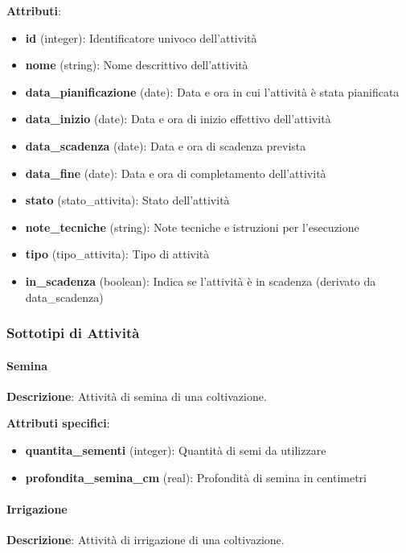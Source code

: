\documentclass[12pt,a4paper]{article}
\begin{document}
\textbf{Attributi}:
\begin{itemize}[leftmargin=2.5cm]
    \item \textbf{id} (integer): Identificatore univoco dell'attività
    \item \textbf{nome} (string): Nome descrittivo dell'attività
    \item \textbf{data\_pianificazione} (date): Data e ora in cui l'attività è stata pianificata
    \item \textbf{data\_inizio} (date): Data e ora di inizio effettivo dell'attività
    \item \textbf{data\_scadenza} (date): Data e ora di scadenza prevista
    \item \textbf{data\_fine} (date): Data e ora di completamento dell'attività
    \item \textbf{stato} (stato\_attivita): Stato dell'attività
    \item \textbf{note\_tecniche} (string): Note tecniche e istruzioni per l'esecuzione
    \item \textbf{tipo} (tipo\_attivita): Tipo di attività
    \item \textbf{in\_scadenza} (boolean): Indica se l'attività è in scadenza (derivato da data\_scadenza)
\end{itemize}

\subsubsection{Sottotipi di Attività}

\paragraph{Semina}
\textbf{Descrizione}: Attività di semina di una coltivazione.

\textbf{Attributi specifici}:
\begin{itemize}[leftmargin=2.5cm]
    \item \textbf{quantita\_sementi} (integer): Quantità di semi da utilizzare
    \item \textbf{profondita\_semina\_cm} (real): Profondità di semina in centimetri
\end{itemize}

\paragraph{Irrigazione}
\textbf{Descrizione}: Attività di irrigazione di una coltivazione.
\end{document}
